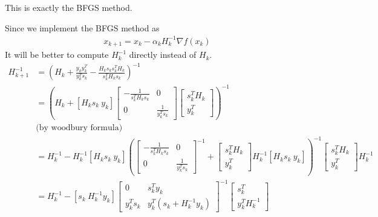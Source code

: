 \documentclass[11pt,a4paper]{article}
\begin{document}
This is exactly the BFGS method.

Since we implement the BFGS method as
\begin{equation}
    \begin{aligned}
        x_{k+1}=x_k-\alpha_k H_k^{-1}\nabla f(x_k)
    \end{aligned}
    \nonumber
\end{equation}
It will be better to compute $H_{k}^{-1}$ directly instead of $H_k$.
\begin{equation}
    \begin{aligned}
        H_{k+1}^{-1}&=\left(H_k+\frac{y_ky_k^T}{y_k^T s_k}-\frac{H_k s_ks_k^TH_k}{s_k^TH_ks_k}\right)^{-1}\\
        &=\left(H_k+[H_ks_k\ y_k]
        \begin{bmatrix}
            -\frac{1}{s_k^TH_ks_k}&0\\
            0&\frac{1}{y_k^Ts_k}
        \end{bmatrix}
        \begin{bmatrix}
            s_k^TH_k\\
            y_k^T
        \end{bmatrix}\right)^{-1}\\
        &\text{(by woodbury formula)}\\
        &=H_k^{-1}-H_k^{-1}[H_ks_k\ y_k]\left(\begin{bmatrix}
            -\frac{1}{s_k^TH_ks_k}&0\\
            0&\frac{1}{y_k^Ts_k}
        \end{bmatrix}^{-1}+
        \begin{bmatrix}
            s_k^TH_k\\
            y_k^T
        \end{bmatrix}H_k^{-1}[H_ks_k\ y_k]\right)^{-1}\begin{bmatrix}
            s_k^TH_k\\
            y_k^T
        \end{bmatrix}H_k^{-1}\\
        &=H_k^{-1}-[s_k\ H_k^{-1}y_k]\begin{bmatrix}
            0&s_k^Ty_k\\
            y_k^Ts_k&y_k^T(s_k+H_k^{-1}y_k)
        \end{bmatrix}^{-1}\begin{bmatrix}
            s_k^T\\
            y_k^TH_k^{-1}
        \end{bmatrix}\\

\end{aligned}
\end{equation}
\end{document}
